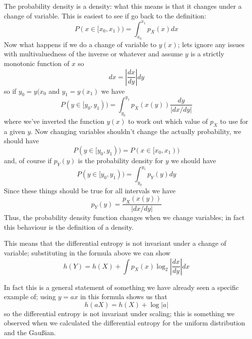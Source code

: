 \documentclass[12pt]{article}
\begin{document}
The probability density is a density: what this means is that it
changes under a change of variable. This is easiest to see if go back to the definition:
\begin{equation}
  P(x\in[x_0,x_1))=\int_{x_0}^{x_1}p_X(x)dx
\end{equation}
Now what happens if we do a change of variable to $y(x)$; lets ignore
any issues with multivaluedness of the inverse or whatever and assume
$y$ is a strictly monotonic function of $x$ so
\begin{equation}
  dx=\left|\frac{dx}{dy}\right|dy
\end{equation}
so if $y_0=y(x_0$ and $y_1=y(x_1)$ we have
\begin{equation}
  P(y\in[y_0,y_1))=\int_{y_0}^{y_1} p_X(x(y))\frac{dy}{|dx/dy|}
\end{equation}
where we've inverted the function $y(x)$ to work out which value of
$p_X$ to use for a given $y$. Now changing variables shouldn't change
the actually probability, we should have
\begin{equation}
  P(y\in[y_0,y_1))=  P(x\in[x_0,x_1))
\end{equation}
and, of course if $p_Y(y)$ is the probability density for $y$ we should have 
\begin{equation}
  P(y\in[y_0,y_1))=\int_{y_0}^{y_1} p_Y(y)dy
\end{equation}
Since these things should be true for all intervals we have
\begin{equation}
  p_Y(y)=\frac{p_X(x(y))}{|dx/dy|}
\end{equation}
Thus, the probability density function changes when we change
variables; in fact this behaviour is the definition of a density.

This means that the differential entropy is not invariant under a change of variable; substituting in the formula above we can show
\begin{equation}
  h(Y)=h(X)+\int p_X(x) \log_2\left|\frac{dx}{dy}\right|dx
\end{equation}

In fact this is a general statement of something we have already seen
a specific example of; using $y=a x$ in this formula shows us that
\begin{equation}
  h(aX)=h(X)+\log{|a|}
\end{equation}
so the differential entropy is not invariant under scaling; this is
something we observed when we calculated the differential entropy for
the uniform distribution and the Gau{\ss}ian.
\end{document}
